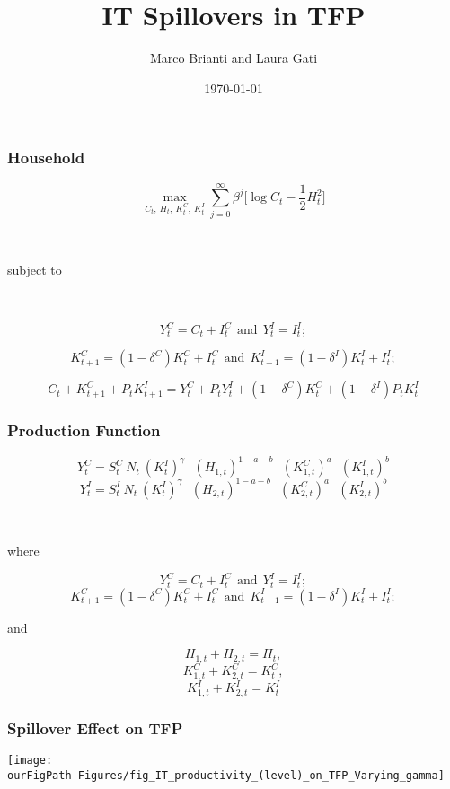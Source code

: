 \documentclass{beamer}
\author[Brianti, Gati]{Marco Brianti and Laura Gati}
\institute[Boston College]{Boston College}
\title{IT Spillovers in TFP }
\date{\today}
\def \ourFigPath {../../}
\begin{document}
\begin{frame}

\maketitle


\end{frame}

\begin{frame}
\frametitle{Household}

$$
\max_{C_t, \ H_t, \ K_t^C, \ K_t^I} \sum_{j=0}^{\infty} \beta^j \bigg[ \log C_t -  \frac{1}{2} H_t^2 \bigg]
$$

\

subject to

\


$$
Y^C_t = C_t + I^C_t \ \ \text{and} \ \ Y_t^I = I^I_t;
$$


$$
K^C_{t+1} = (1 - \delta^C)K^C_t + I^C_t \ \ \text{and} \ \ K^I_{t+1} = (1 - \delta^I)K^I_t + I^I_t;
$$


$$
C_t + K^C_{t+1} + P_t K^I_{t+1} = Y^C_t + P_t Y^I_t + (1 - \delta^C)K^C_t + (1 - \delta^I)P_t K^I_t
$$


\end{frame}

\begin{frame}
\frametitle{Production Function}

$$
Y^C_t = S_t^C \  N_t \ (K^I_t)^{\gamma} \ \ \  (H_{1,t})^{1-a-b} \ \ \  (K_{1,t}^C)^{a} \ \ \ (K_{1,t}^I)^{b}
$$
$$
Y^I_t = S_t^I \  N_t \ (K^I_t)^{\gamma} \ \ \  (H_{2,t})^{1-a-b} \ \ \  (K_{2,t}^C)^{a} \ \ \ (K_{2,t}^I)^{b}
$$

\


where

$$
Y^C_t = C_t + I^C_t \ \ \text{and} \ \ Y_t^I = I^I_t;
$$
$$
K^C_{t+1} = (1 - \delta^C)K^C_t + I^C_t \ \ \text{and} \ \ K^I_{t+1} = (1 - \delta^I)K^I_t + I^I_t;
$$

and


$$
H_{1,t} + H_{2,t} = H_t, 
$$
$$
K_{1,t}^C + K_{2,t}^C = K_t^C, 
$$
$$
K_{1,t}^I + K_{2,t}^I = K_t^I
$$





\end{frame}


\begin{frame}
\frametitle{Spillover Effect on TFP}

\begin{center}
	\texttt{[image: \\ourFigPath Figures/fig\_IT\_productivity\_(level)\_on\_TFP\_Varying\_gamma]}
\end{center}

\end{frame}
\end{document}
